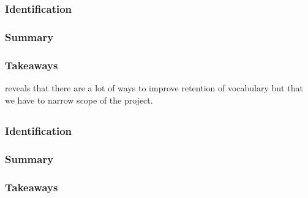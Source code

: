 \documentclass[
	letterpaper, %
]{jdf}
\begin{document}
\subsubsection{Identification}

\subsubsection{Summary}


\subsubsection{Takeaways}
reveals that there are a lot of ways to improve retention of vocabulary but that we have to narrow scope of the project.

\subsection{}
\subsubsection{Identification}

\subsubsection{Summary}


\subsubsection{Takeaways}


\subsection{}
\end{document}
